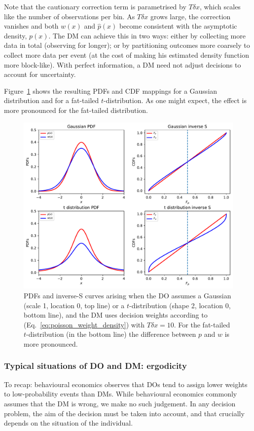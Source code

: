 \documentclass[a4paper, 12pt]{article}
\newcommand{\eref}[1]{(Eq.~\ref{eq:#1})}
\newcommand{\flabel}[1]{\label{fig:#1}}
\newcommand{\Fref}[1]{Figure~\ref{fig:#1}}
\begin{document}
Note that the cautionary correction term is parametrised by $T\delta x$, which scales like the number of observations per bin. As $T\delta x$ grows large, the correction vanishes and both $w(x)$ and $\hat{p}(x)$ become consistent with the asymptotic density, $p(x)$. The DM can achieve this in two ways: either by collecting more data in total (observing for longer); or by partitioning outcomes more coarsely to collect more data per event (at the cost of making his estimated density function more block-like). With perfect information, a DM need not adjust decisions to account for uncertainty.

\Fref{square_root_error} shows the resulting PDFs and CDF mappings for a Gaussian distribution and for a fat-tailed $t$-distribution. As one might expect, the effect is more pronounced for the fat-tailed distribution.
\begin{figure}[htb]
\centering
\includegraphics[width=1.0\textwidth]{./figs/square_root_error.pdf}
\caption{PDFs and inverse-S curves arising when the DO assumes a Gaussian (scale 1, location 0, top line) or a $t$-distribution (shape 2, location 0, bottom line), and the DM uses decision weights according to \eref{poisson_weight_density} with $T\delta x=10$. For the fat-tailed $t$-distribution (in the bottom line) the difference between $p$ and $w$ is more pronounced.}
\flabel{square_root_error}
\end{figure}

\FloatBarrier
\subsubsection{Typical situations of DO and DM: ergodicity}
To recap: behavioural economics observes that DOs tend to assign lower weights to low-probability events than DMs.
While behavioural economics commonly assumes that the DM is wrong, we make no such judgement. In any decision problem, the aim of the decision must be taken into account, and that crucially depends on the situation of the individual. 
\end{document}
